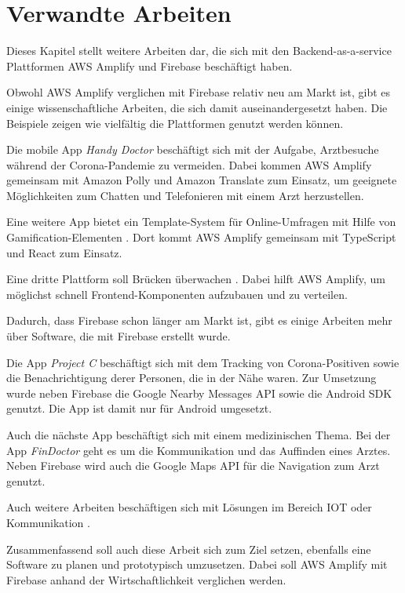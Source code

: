 \chapter{Verwandte Arbeiten}
\label{kap3}

Dieses Kapitel stellt weitere Arbeiten dar, die sich mit den Backend-as-a-service Plattformen \ac{AWS} Amplify und Firebase beschäftigt haben.

Obwohl \ac{AWS} Amplify verglichen mit Firebase relativ neu am Markt ist, gibt es einige wissenschaftliche Arbeiten, die sich damit auseinandergesetzt haben. Die Beispiele zeigen wie vielfältig die Plattformen genutzt werden können.

Die mobile App \textit{Handy Doctor} \autocite{st2021handy} beschäftigt sich mit der Aufgabe, Arztbesuche während der Corona-Pandemie zu vermeiden. Dabei kommen \ac{AWS} Amplify gemeinsam mit Amazon Polly und Amazon Translate zum Einsatz, um geeignete Möglichkeiten zum Chatten und Telefonieren mit einem Arzt herzustellen.

Eine weitere App bietet ein Template-System für Online-Umfragen mit Hilfe von Gamification-Elementen \autocite{kuwamura2021application}. Dort kommt AWS Amplify gemeinsam mit TypeScript und React zum Einsatz.

Eine dritte Plattform soll Brücken überwachen \autocite{naraharisetty2021cloud}. Dabei hilft \ac{AWS} Amplify, um möglichst schnell Frontend-Komponenten aufzubauen und zu verteilen.

Dadurch, dass Firebase schon länger am Markt ist, gibt es einige Arbeiten mehr über Software, die mit Firebase erstellt wurde.

Die App \textit{Project C} \autocite{rahman2021project} beschäftigt sich mit dem Tracking von Corona-Positiven sowie die Benachrichtigung derer Personen, die in der Nähe waren. Zur Umsetzung wurde neben Firebase die Google Nearby Messages API sowie die Android SDK genutzt. Die App ist damit nur für Android umgesetzt.

Auch die nächste App beschäftigt sich mit einem medizinischen Thema. Bei der App \textit{FinDoctor} \autocite{rahmi2017findoctor} geht es um die Kommunikation und das Auffinden eines Arztes. Neben Firebase wird auch die Google Maps API für die Navigation zum Arzt genutzt.

Auch weitere Arbeiten beschäftigen sich mit Lösungen im Bereich IOT oder Kommunikation \autocite{li2018justiot} \autocite{sharma2019firebase} \autocite{bhadoria2020chatapp} \autocite{khawas2018application}.

Zusammenfassend soll auch diese Arbeit sich zum Ziel setzen, ebenfalls eine Software zu planen und prototypisch umzusetzen. Dabei soll \ac{AWS} Amplify mit Firebase anhand der Wirtschaftlichkeit verglichen werden.